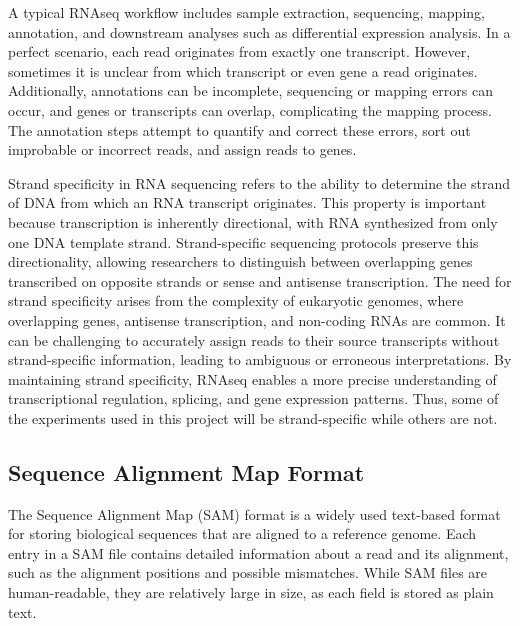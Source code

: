 \documentclass{article}
\begin{document}
    A typical RNAseq workflow includes sample extraction, sequencing, mapping, annotation, and downstream analyses such as differential expression analysis. In a perfect scenario, each read originates from exactly one transcript. However, sometimes it is unclear from which transcript or even gene a read originates. Additionally, annotations can be incomplete, sequencing or mapping errors can occur, and genes or transcripts can overlap, complicating the mapping process. The annotation steps attempt to quantify and correct these errors, sort out improbable or incorrect reads, and assign reads to genes.

    Strand specificity in RNA sequencing refers to the ability to determine the strand of DNA from which an RNA transcript originates. This property is important because transcription is inherently directional, with RNA synthesized from only one DNA template strand. Strand-specific sequencing protocols preserve this directionality, allowing researchers to distinguish between overlapping genes transcribed on opposite strands or sense and antisense transcription. The need for strand specificity arises from the complexity of eukaryotic genomes, where overlapping genes, antisense transcription, and non-coding RNAs are common. It can be challenging to accurately assign reads to their source transcripts without strand-specific information, leading to ambiguous or erroneous interpretations. By maintaining strand specificity, RNAseq enables a more precise understanding of transcriptional regulation, splicing, and gene expression patterns. Thus, some of the experiments used in this project will be strand-specific while others are not.

    \subsection[SAM Format]{Sequence Alignment Map Format}
    The Sequence Alignment Map (SAM) format is a widely used text-based format for storing biological sequences that are aligned to a reference genome. Each entry in a SAM file contains detailed information about a read and its alignment, such as the alignment positions and possible mismatches. While SAM files are human-readable, they are relatively large in size, as each field is stored as plain text.
\end{document}
